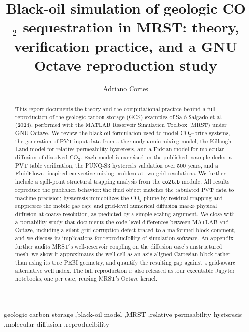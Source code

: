 \documentclass[preprint,11pt]{elsarticle}
\begin{document}
\begin{frontmatter}

\title{Black-oil simulation of geologic CO$_2$ sequestration in MRST:
theory, verification practice, and a GNU Octave reproduction study}

\author[1]{Adriano Cortes}
\address[1]{---}

\begin{abstract}
This report documents the theory and the computational practice behind a
full reproduction of the geologic carbon storage (GCS) examples of
Sal\'o-Salgado et al. (2024), performed with the MATLAB Reservoir
Simulation Toolbox (MRST) under GNU Octave. We review the black-oil
formulation used to model CO$_2$--brine systems, the generation of PVT
input data from a thermodynamic mixing model, the Killough--Land model for
relative permeability hysteresis, and a Fickian model for molecular
diffusion of dissolved CO$_2$. Each model is exercised on the published
example decks: a PVT table verification, the PUNQ-S3 hysteresis validation
over 500 years, and a FluidFlower-inspired convective mixing problem at
two grid resolutions. We further include a spill-point structural trapping
analysis from the \texttt{co2lab} module. All results reproduce the
published behavior: the fluid object matches the tabulated PVT data to
machine precision; hysteresis immobilizes the CO$_2$ plume by residual
trapping and suppresses the mobile gas cap; and grid-level numerical
diffusion masks physical diffusion at coarse resolution, as predicted by a
simple scaling argument. We close with a portability study that documents
the code-level differences between MATLAB and Octave, including a silent
grid-corruption defect traced to a malformed block comment, and we discuss
its implications for reproducibility of simulation software. An appendix
further audits MRST's well-reservoir coupling on the diffusion case's
unstructured mesh: we show it approximates the well cell as an
axis-aligned Cartesian block rather than using its true PEBI geometry, and
quantify the resulting gap against a grid-aware alternative well index.
The full reproduction is also released as four executable Jupyter
notebooks, one per case, reusing MRST's Octave kernel.
\end{abstract}

\begin{keyword}
geologic carbon storage \sep black-oil model \sep MRST \sep relative
permeability hysteresis \sep molecular diffusion \sep reproducibility
\end{keyword}

\end{frontmatter}
\end{document}
